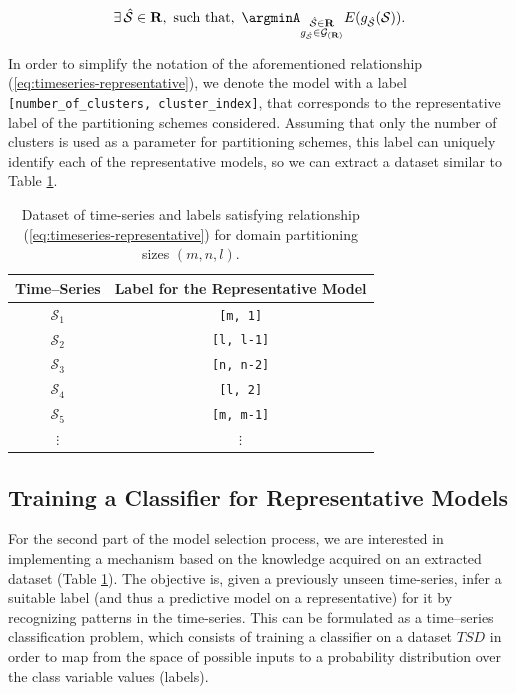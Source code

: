 \begin{equation}\label{eq:timeseries-representative}
\exists\, \mathcal{\hat{S}} \in \mathbf{R}, \,\, \textrm{such that}, \,\, \argminA_{\substack{\mathcal{\hat{S}} \in \mathbf{R}\\g_{\mathcal{\hat{S}}} \in \mathcal{G}_{(\mathbf{R})}}} E (g_{\mathcal{\hat{S}}}(\mathcal{S})).
\end{equation}

In order to simplify the notation of the aforementioned relationship (\ref{eq:timeseries-representative}), we denote the model with a label \texttt{[number\_of\_clusters, cluster\_index]}, that corresponds to the representative label of the partitioning schemes considered. Assuming that only the number of clusters is used as a parameter for partitioning schemes, this label can uniquely identify each of the representative models, so we can extract a dataset similar to Table \ref{Tab:TSClassificationDataset}.

\begin{table}[h]
	\centering
	\begin{tabular}{|c|c|}
		\hline
		Time--Series   & Label for the Representative Model\\ \hline
		$\mathcal{S}_{1}$  & \texttt{[m, 1]} \\ \hline
		$\mathcal{S}_{2}$ & \texttt{[l, l-1]} \\ \hline
		$\mathcal{S}_{3}$ & \texttt{[n, n-2]} \\ \hline
		$\mathcal{S}_{4}$ & \texttt{[l, 2]} \\ \hline
		$\mathcal{S}_{5}$ & \texttt{[m, m-1]} \\ \hline
		$\vdots$       & $\vdots$ \\ \hline
	\end{tabular}
	\caption{Dataset of time-series and labels satisfying relationship (\ref{eq:timeseries-representative}) for domain partitioning sizes $(m,n,l)$.}
	\label{Tab:TSClassificationDataset}
\end{table}

\subsection{Training a Classifier for Representative Models}
\label{Sec:TrainingClassifier}
For the second part of the model selection process, we are interested in implementing a mechanism based on the knowledge acquired on an extracted dataset (Table \ref{Tab:TSClassificationDataset}). The objective is, given a previously unseen time-series, infer a suitable label (and thus a predictive model on a representative) for it by recognizing patterns in the time-series. This can be formulated as a time--series classification problem, which consists of training a classifier on a dataset $TSD$ in order to map from the space of possible inputs to a probability distribution over the class variable values (labels). 

